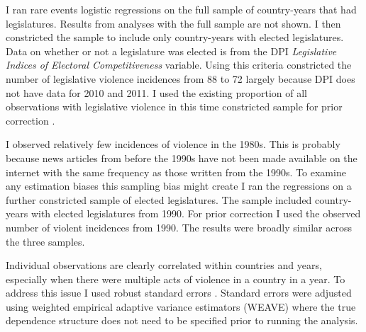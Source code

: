 \documentclass[a4paper]{article}\usepackage{graphicx, color}
\begin{document}
I ran rare events logistic regressions on the full sample of country-years that had legislatures. Results from analyses with the full sample are not shown. I then constricted the sample to include only country-years with elected legislatures. Data on whether or not a legislature was elected is from the DPI {\emph{Legislative Indices of Electoral Competitiveness}} variable. Using this criteria constricted the number of legislative violence incidences from 88 to 72 largely because DPI does not have data for 2010 and 2011. I used the existing proportion of all observations with legislative violence in this time constricted sample for prior correction \citep[see][]{KingRareEventsPA2001}. 

I observed relatively few incidences of violence in the 1980s. This is probably because news articles from before the 1990s have not been made available on the internet with the same frequency as those written from the 1990s. To examine any estimation biases this sampling bias might create I ran the regressions on a further constricted sample of elected legislatures. The sample included country-years with elected legislatures from 1990. For prior correction I used the observed number of violent incidences from 1990. The results were broadly similar across the three samples. 

Individual observations are clearly correlated within countries and years, especially when there were multiple acts of violence in a country in a year. To address this issue I used robust standard errors \citep{Golder2006, Mainwaring2007}. Standard errors were adjusted using \cite{Lumley1999} weighted empirical adaptive variance estimators (WEAVE) where the true dependence structure does not need to be specified prior to running the analysis. 
\end{document}
